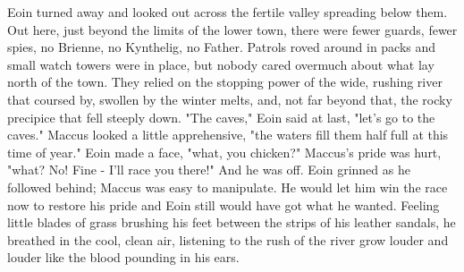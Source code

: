 \documentclass[twoside]{article}
\begin{document}
Eoin turned away and looked out across the fertile valley spreading below them. Out here, just beyond the limits of the lower town, there were fewer guards, fewer spies, no Brienne, no Kynthelig, no Father. Patrols roved around in packs and small watch towers were in place, but nobody cared overmuch about what lay north of the town. They relied on the stopping power of the wide, rushing river that coursed by, swollen by the winter melts, and, not far beyond that, the rocky precipice that fell steeply down.
"The caves," Eoin said at last, "let's go to the caves."
Maccus looked a little apprehensive, "the waters fill them half full at this time of year."
Eoin made a face, "what, you chicken?"
Maccus's pride was hurt, "what? No! Fine - I'll race you there!" And he was off.
Eoin grinned as he followed behind; Maccus was easy to manipulate. He would let him win the race now to restore his pride and Eoin still would have got what he wanted. Feeling little blades of grass brushing his feet between the strips of his leather sandals, he breathed in the cool, clean air, listening to the rush of the river grow louder and louder like the blood pounding in his ears.
\end{document}
